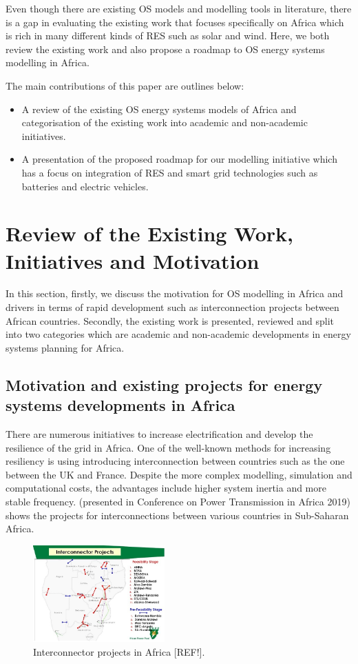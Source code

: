 \documentclass[conference, a4paper]{IEEEtran}
\begin{document}
Even though there are existing OS models and modelling tools in literature, there is a gap in evaluating the existing work that focuses specifically on Africa which is rich in many different kinds of RES such as solar and wind.
Here, we both review the existing work and also propose a roadmap to OS energy systems modelling in Africa.

The main contributions of this paper are outlines below:
\begin{itemize}
    \item A review of the existing OS energy systems models of Africa and categorisation of the existing work into academic and non-academic initiatives.
    \item A presentation of the proposed roadmap for our modelling initiative which has a focus on integration of RES and smart grid technologies such as batteries and electric vehicles.
\end{itemize}


\section{Review of the Existing Work, Initiatives and Motivation}
In this section, firstly, we discuss the motivation for OS modelling in Africa and drivers in terms of rapid development such as interconnection projects between African countries. Secondly, the existing work is presented, reviewed and split into two categories which are academic and non-academic developments in energy systems planning for Africa.

\subsection{Motivation and existing projects for energy systems developments in Africa}
There are numerous initiatives to increase electrification and develop the resilience of the grid in Africa. One of the well-known methods for increasing resiliency is using introducing interconnection between countries such as the one between the UK and France. Despite the more complex modelling, simulation and computational costs, the advantages include higher system inertia and more stable frequency.  (presented in Conference on Power Transmission in Africa 2019) shows the projects for interconnections between various countries in Sub-Saharan Africa.

\begin{figure}[t]
\centerline{\includegraphics[width = 0.45\textwidth]{Figures/interconnector.jpg}}
\caption{Interconnector projects in Africa [REF!].}
\label{interconnector}
\end{figure}
\end{document}
